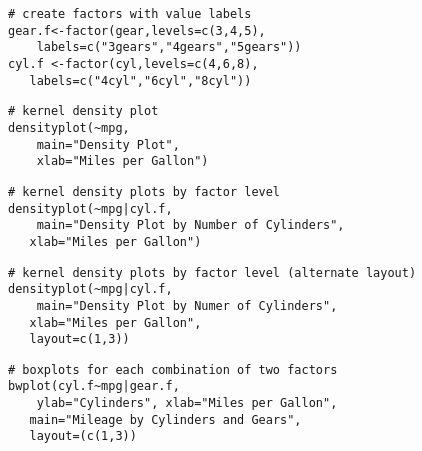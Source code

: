 \begin{frame}[fragile]
\begin{framed}
\begin{verbatim}
# create factors with value labels 
gear.f<-factor(gear,levels=c(3,4,5),
  	labels=c("3gears","4gears","5gears")) 
cyl.f <-factor(cyl,levels=c(4,6,8),
   labels=c("4cyl","6cyl","8cyl")) 
\end{verbatim}
\end{framed}
\end{frame}
\begin{frame}[fragile]
\begin{framed}
\begin{verbatim}
# kernel density plot 
densityplot(~mpg, 
  	main="Density Plot", 
  	xlab="Miles per Gallon")
\end{verbatim}
\end{framed}
\end{frame}
\begin{frame}[fragile]
\begin{framed}
\begin{verbatim}
# kernel density plots by factor level 
densityplot(~mpg|cyl.f, 
  	main="Density Plot by Number of Cylinders",
   xlab="Miles per Gallon")
\end{verbatim}
\end{framed}
\end{frame}
\begin{frame}[fragile]
\begin{framed}
\begin{verbatim}
# kernel density plots by factor level (alternate layout) 
densityplot(~mpg|cyl.f, 
  	main="Density Plot by Numer of Cylinders",
   xlab="Miles per Gallon", 
   layout=c(1,3))

\end{verbatim}
\end{framed}
\end{frame}
\begin{frame}[fragile]
\begin{framed}
\begin{verbatim}
# boxplots for each combination of two factors 
bwplot(cyl.f~mpg|gear.f,
  	ylab="Cylinders", xlab="Miles per Gallon", 
   main="Mileage by Cylinders and Gears", 
   layout=(c(1,3))
\end{verbatim}
\end{framed}
\end{frame}
